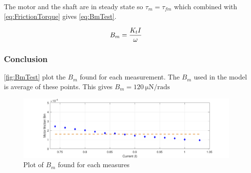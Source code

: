 The motor and the shaft are in steady state so $\tau_m=\tau_{fm}$ which combined with \autoref{eq:FrictionTorque} gives \autoref{eq:BmTest}.

\begin{equation}\label{eq:BmTest}
B_m=\frac{K_t I}{\omega} \addunit{\newton\per\radian\second}
\end{equation}
\startexplain
{}
\stopexplain

\subsubsection*{Conclusion}

\autoref{fig:BmTest} plot the $B_m$ found for each measurement. The $B_m$ used in the model is average of these points. This gives $B_m=\SI{120}{\micro\newton\per\radian\second}$

\begin{figure}[htbp]
	\centering
	\includegraphics[width=\textwidth]{figures/appendix/Motor&GearTests/PlotBm}
	\caption{Plot of $B_m$ found for each measures}\label{fig:BmTest}
\end{figure}
\break
